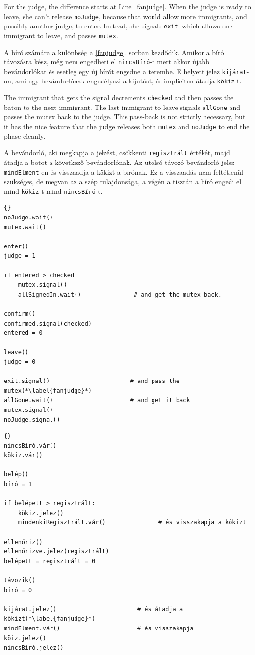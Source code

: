 \documentclass{book}
\begin{document}
For the judge, the difference starts at Line~\ref{fanjudge}.
When the judge is ready to leave, she can't release {\tt noJudge},
because that would allow more immigrants, and possibly another
judge, to enter.  Instead, she signals {\tt exit}, which allows
one immigrant to leave, and passes {\tt mutex}.

A bíró számára a különbség a \ref{fanjudge}. sorban kezdődik.
Amikor a bíró távozásra kész, még nem engedheti el {\tt nincsBíró}-t
mert akkor újabb bevándorlókat és esetleg egy új bírót engedne
a terembe. E helyett jelez {\tt kijárat}-on, ami egy
bevándorlónak engedélyezi a kijutást, és impliciten átadja {\tt kökiz}-t.

The immigrant that gets the signal decrements {\tt checked} and
then passes the baton to the next immigrant.  The last immigrant
to leave signals {\tt allGone} and passes the mutex back to the
judge.  This pass-back is not strictly necessary, but it has
the nice feature that the judge releases both {\tt mutex}
and {\tt noJudge} to end the phase cleanly.

A bevándorló, aki megkapja a jelzést, csökkenti {\tt regisztrált}
értékét, majd átadja a botot a következő bevándorlónak.
Az utolsó távozó bevándorló jelez {\tt mindElment}-en és
visszaadja a kökizt a bírónak. Ez a visszaadás nem feltétlenül
szükséges, de megvan az a szép tulajdonsága, a végén a
tisztán a bíró engedi el mind {\tt kökiz}-t mind {\tt nincsBíró}-t.

\newpage
\begin{lstlisting}[title={Faneuil Hall problem solution (judge)}]{}
noJudge.wait()
mutex.wait()

enter()
judge = 1

if entered > checked:
    mutex.signal()
    allSignedIn.wait()               # and get the mutex back.

confirm()
confirmed.signal(checked)
entered = 0

leave()
judge = 0

exit.signal()                       # and pass the mutex(*\label{fanjudge}*)
allGone.wait()                      # and get it back
mutex.signal()
noJudge.signal()
\end{lstlisting}

\begin{lstlisting}[title={Kibővített Faneuil Hall probléma megoldás (bíró)}]{}
nincsBíró.vár()
kökiz.vár()

belép()
bíró = 1

if belépett > regisztrált:
    kökiz.jelez()
    mindenkiRegisztrált.vár()               # és visszakapja a kökizt

ellenőriz()
ellenőrizve.jelez(regisztrált)
belépett = regisztrált = 0

távozik()
bíró = 0

kijárat.jelez()                       # és átadja a kökizt(*\label{fanjudge}*)
mindElment.vár()                      # és visszakapja
köiz.jelez()
nincsBíró.jelez()
\end{lstlisting}
\end{document}
